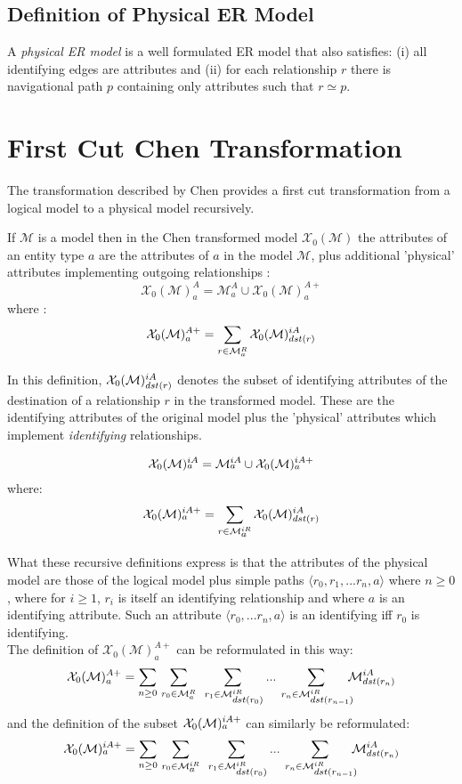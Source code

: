 \documentclass[10pt,a4paper]{article}
\newcommand{\term}[1]{\textit{{#1}}}
\newcommand{\genericmodel}{\mathcal{M}}
\newcommand{\chen}{\mathcal{X}_0}
\newcommand{\chengenericmodel}{\chen(\genericmodel)}
\newcommand{\allAttrs}{\genericmodel^A}
\newcommand{\allRels}{\genericmodel^R}
\newcommand{\attrs}[1]{\allAttrs_{#1}}
\newcommand{\rels}[1]{\allRels_{#1}}
\newcommand{\allIdAttrs}{\genericmodel^{iA}}
\newcommand{\allIdRels}{\genericmodel^{iR}}
\newcommand{\idAttrs}[1]{\allIdAttrs_{\raisebox{2pt}{$\scriptstyle{#1}$}}}
\newcommand{\idRels}[1]{\allIdRels_{\raisebox{2pt}{$\scriptstyle{#1}$}}}
\newcommand{\chenAttrs}[1]{\chen(\genericmodel)^A_{#1}}
\newcommand{\chenFKattrs}[1]{\chen(\genericmodel)^{A+}_{#1}}
\newcommand{\chenIdAttrs}[1]{\chen(\genericmodel)^{iA}_{\raisebox{2pt}{$\scriptstyle{#1}$}}}
\newcommand{\chenFKidAttrs}[1]{\chen(\genericmodel)^{iA+}_{\raisebox{2pt}{$\scriptstyle{#1}$}}}
\begin{document}
\subsection{Definition of Physical ER Model}
\begin{definition}
\noindent 
A \term{physical ER model} is a well formulated ER model
that also satisfies:
 (i) all identifying edges are attributes and 
(ii) for each relationship $r$ there is navigational path $p$ containing only attributes such that $r \simeq p$. 
\end{definition}


\section{First Cut Chen Transformation}
\noindent The transformation described by Chen provides a  first cut transformation from a logical model to a physical model recursively.

\noindent If $\genericmodel$ is a model then in the Chen transformed model $\chengenericmodel$ 
the attributes of an entity type $a$ are the attributes of $a$ in the model $\genericmodel$,  plus additional 'physical' attributes implementing outgoing relationships :
\noindent
$$
\chenAttrs{a} = \attrs{a} \cup \chenFKattrs{a}
$$
\noindent
where :
$$
\chenFKattrs{a} = \sum_{r \in \rels{a}}{\chenIdAttrs{dst(r)}}
$$

\noindent In this definition, $\chenIdAttrs{dst(r)}$ denotes the subset of identifying attributes of the destination of
a relationship $r$ in the transformed model. These are the identifying attributes of the original model plus the 'physical' attributes which implement \textit{identifying} relationships.

$$
\chenIdAttrs{a} = \idAttrs{a}  \cup \chenFKidAttrs{a}
$$
where:
$$
\chenFKidAttrs{a} = \sum_{r \in \idRels{a}}{\chenIdAttrs{dst(r)}}
$$


\noindent What these recursive definitions express is that the attributes of the physical model are those of the logical model plus simple paths $\langle r_0,r_1,...r_n,a \rangle$ where $n \geq 0$,  where for $i \geq 1$,  $r_i$ is itself an identifying relationship and  where
$a$ is an identifying attribute. Such an attribute $\langle r_0,...r_n, a \rangle$  is an identifying iff  $r_0$ is identifying.\\


\noindent The definition of $\chenFKattrs{a}$ can be reformulated in this way:
$$
\chenFKattrs{a}=\sum_{n \geq 0} \, \sum_{r_0 \in \rels{a}} \; \sum_{\; r_1 \in \idRels{dst(r_0)}}...\sum_{\;r_n \in \idRels{dst(r_{n-1})}}\!\!\!\!\idAttrs{dst(r_n)}
$$
and the definition of the subset $\chenFKidAttrs{a}$ can similarly be reformulated:
$$
\chenFKidAttrs{a} = \sum_{n \geq 0} \, \sum_{r_0 \in \idRels{a}} \; \sum_{\; r_1 \in \idRels{dst(r_0)}}...\sum_{\;r_n \in \idRels{dst(r_{n-1})}}\!\!\!\!\idAttrs{dst(r_n)}
$$
\end{document}
